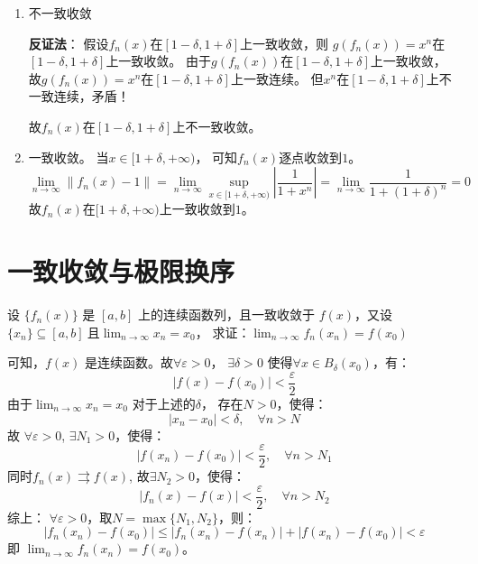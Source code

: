 \begin{solution}
\begin{enumerate}
        \item 不一致收敛

            \textbf{反证法}：
            假设\(f_{n}(x)\)在\([1-\delta,1+\delta]\)上一致收敛，则
            \(g(f_n(x))=x^{n}\)在\([1-\delta,1+\delta]\)上一致收敛。
            由于\(g(f_n(x))\)在\([1-\delta,1+\delta]\)上一致收敛，
            故\(g(f_n(x)) = x^{n}\)在\([1-\delta,1+\delta]\)上一致连续。
            但\(x^{n}\)在\([1-\delta,1+\delta]\)上不一致连续，矛盾！

            故\(f_{n}(x)\)在\([1-\delta,1+\delta]\)上不一致收敛。

        \item 一致收敛。
            当\(x \in [1+\delta,+\infty)\)，
            可知\(f_n(x)\)逐点收敛到\(1\)。%
            \[
                \lim_{n \to \infty} \left\lVert f_{n}(x) -
                1 \right\rVert
                = \lim_{n \to \infty} \sup_{x \in
                [1+\delta,+\infty)} \left\vert %
                \frac{1}{1 + x^{n}} \right\vert
                = \lim_{n \to \infty} \frac{1}{1+(1+\delta)^{n}} = 0
            \]
            故\(f_{n}(x)\)在\([1+\delta,+\infty)\)上一致收敛到\(1\)。%
    \end{enumerate}
\end{solution}

\section{一致收敛与极限换序}
\begin{problem}
    设 \(\{f_n(x)\}\) 是 \([a, b]\) 上的连续函数列，且一致收敛于 \(f(x)\)，又设\(\{x_n\}
    \subseteq [a, b] \ \)且\( \lim_{n \to \infty} x_n = x_0\)，
    求证：\(\lim_{n \to \infty} f_n(x_n) = f(x_0)\)
\end{problem}

\begin{solution}
    可知，\(f(x)\) 是连续函数。故\(\forall \varepsilon > 0\)，
    \(\exists \delta > 0\)
    使得\(\forall x \in B_{\delta}(x_{0})\)，有：
    \[
        \left| f(x)- f(x_{0}) \right| < \frac{\varepsilon}{2}
    \]
    由于\(\lim_{n \to \infty} x_{n}=x_{0}\) 对于上述的\(\delta\)，
    存在\(N>0\)，使得：
    \[
        \left| x_{n} - x_{0} \right| < \delta, \quad \forall n > N
    \]
    故 \(\forall \varepsilon > 0\), \(\exists N_1 > 0\)，使得：
    \[
        \left| f(x_{n})- f(x_{0}) \right| <
        \frac{\varepsilon}{2}, \quad
        \forall n > N_1
    \]
    同时\(f_{n}(x) \rightrightarrows f(x)\), 故\(\exists N_2 > 0\)，使得：
    \[
        \left| f_{n}(x) - f(x) \right| < \frac{\varepsilon}{2}, \quad
        \forall n > N_2
    \]
    综上： \(\forall \varepsilon > 0\)，取\(N = \max\{N_1, N_2\}\)，则：
    \[
        \left| f_{n}(x_{n}) - f(x_{0}) \right| \le \left|
        f_{n}(x_{n}) -
        f(x_{n}) \right| + \left| f(x_{n}) - f(x_{0})
        \right| < \varepsilon
    \]
    即 \(\lim_{n \to \infty} f_{n}(x_{n}) = f(x_{0})\)。
\end{solution}

